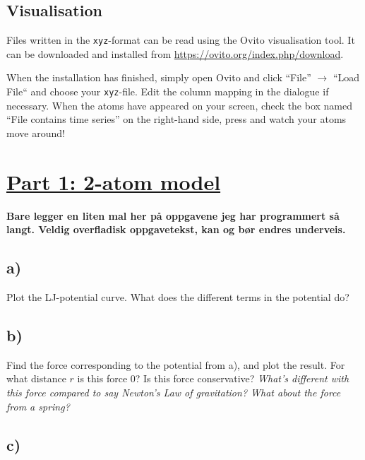\documentclass[11pt,british,a4paper]{report}
\begin{document}
\tikzexternaldisable
\subsection{Visualisation}\label{app:ovito}
Files written in the \texttt{xyz}-format can be read using the Ovito visualisation tool. It can be downloaded and installed from \url{https://ovito.org/index.php/download}.

When the installation has finished, simply open Ovito and click ``File'' \(\to\) ``Load File`` and choose your \texttt{xyz}-file. Edit the column mapping in the dialogue if necessary. When the atoms have appeared on your screen, check the box named ``File contains time series'' on the right-hand side, press  and watch your atoms move around!









\clearpage
\section*{\underline{Part 1: 2-atom model}}

\textbf{Bare legger en liten mal her på oppgavene jeg har programmert så langt. Veldig overfladisk oppgavetekst, kan og bør endres underveis.}

\subsection*{a)}

Plot the LJ-potential curve. What does the different terms in the potential do?

\subsection*{b)}

Find the force corresponding to the potential from a), and plot the result. For what distance $r$ is this force 0? Is this force conservative? \textit{What's different with this force
compared to say Newton's Law of gravitation? What about the force from a spring?}

\subsection*{c)}
\end{document}

